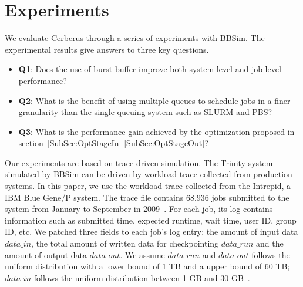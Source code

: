 \section{Experiments}
\label{Sec:Experiments}


We evaluate Cerberus through a series of experiments with BBSim.
The experimental results give answers to three key questions.
\begin{itemize}
        \item \textbf{Q1}: Does the use of burst buffer 
        improve both system-level and job-level performance?
        \item \textbf{Q2}: What is the benefit of using 
        multiple queues to schedule jobs in a finer granularity than the single queuing system such as SLURM and PBS?
        \item \textbf{Q3}: What is the performance gain achieved 
        by the optimization proposed in section~\ref{SubSec:OptStageIn}-\ref{SubSec:OptStageOut}?
\end{itemize}

Our experiments are based on trace-driven simulation.
The Trinity system simulated by BBSim can be driven 
by workload trace collected from production systems.
In this paper, we use the workload trace collected from the Intrepid, a IBM Blue Gene/P system. 
The trace file contains 68,936 jobs
submitted to the system from January to September in 2009~\cite{Tang:IPDPS:2010}.
For each job, its log contains information such as submitted time, expected runtime, wait time, user ID, group ID, etc.
We patched three fields to each job's log entry: the amount of input data $data\_in$,
the total amount of written data for checkpointing $data\_run$
and the amount of output data $data\_out$.
We assume $data\_run$ and $data\_out$ follows the uniform distribution with a
lower bound of 1 TB and a upper bound of 60 TB;
$data\_in$ follows the uniform distribution between 1 GB and 30 GB~\cite{Liu:MSST:2012}.

